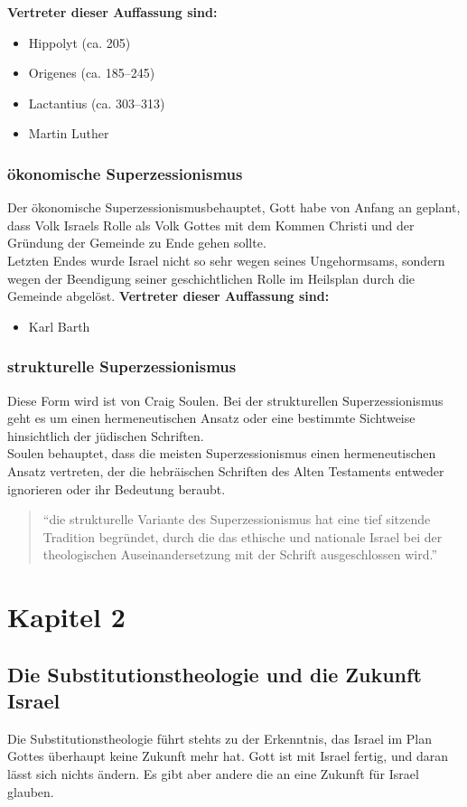 \documentclass{../../inc/mybib}
\newcommand{\st}{Substitutionstheolog}
\newcommand{\sz}{Superzessionismus}
\begin{document}
    \textbf{Vertreter dieser Auffassung sind:}
    \begin{itemize}
        \item Hippolyt (ca. 205)
        \item Origenes (ca. 185--245)
        \item Lactantius (ca. 303--313)
        \item Martin Luther
    \end{itemize}
    \subsubsection{ökonomische \sz}
    Der ökonomische \sz behauptet, Gott habe von Anfang an geplant, dass Volk Israels Rolle als Volk Gottes mit dem Kommen Christi und der Gründung der Gemeinde zu Ende gehen sollte.\\
    Letzten Endes wurde Israel nicht so sehr wegen seines Ungehormsams, sondern wegen der Beendigung seiner geschichtlichen Rolle im Heilsplan durch die Gemeinde abgelöst.
    \textbf{Vertreter dieser Auffassung sind:}
    \begin{itemize}        
        \item Karl Barth
    \end{itemize}
    \subsubsection{strukturelle \sz}
    Diese Form wird ist von Craig Soulen. Bei der strukturellen \sz{} geht es um einen hermeneutischen Ansatz oder eine bestimmte Sichtweise hinsichtlich der jüdischen Schriften.\\
    Soulen behauptet, dass die meisten \sz{} einen hermeneutischen Ansatz vertreten, der die hebräischen Schriften des Alten Testaments entweder ignorieren oder ihr Bedeutung beraubt.
    \begin{quote}
        \enquote{die strukturelle Variante des \sz{} hat eine tief sitzende Tradition begründet, durch die das ethische und nationale Israel bei der theologischen Auseinandersetzung mit der Schrift ausgeschlossen wird.}
    \end{quote}
    \section{Kapitel 2}
    \subsection{Die \st ie und die Zukunft Israel}
    Die \st ie führt stehts zu der Erkenntnis, das Israel im Plan Gottes überhaupt keine Zukunft mehr hat. Gott ist mit Israel fertig, und daran lässt sich nichts ändern.
    Es gibt aber andere die an eine Zukunft für Israel glauben.
\end{document}
